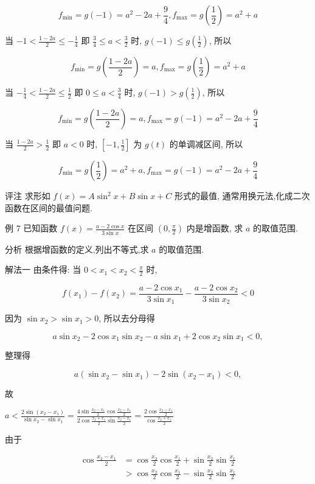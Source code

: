 $$
	f_{\min }=g(-1)=a^{2}-2 a+\frac{9}{4}, f_{\max }=g\left(\frac{1}{2}\right)=a^{2}+a
$$

当 $-1<\frac{1-2 a}{2} \leqslant-\frac{1}{4}$ 即 $\frac{3}{4} \leqslant a<\frac{3}{2}$ 时, $g(-1) \leqslant g\left(\frac{1}{2}\right)$, 所以

$$
	f_{\min }=g\left(\frac{1-2 a}{2}\right)=a, f_{\max }=g\left(\frac{1}{2}\right)=a^{2}+a
$$

当 $-\frac{1}{4}<\frac{1-2 a}{2} \leqslant \frac{1}{2}$ 即 $0 \leqslant a<\frac{3}{4}$ 时, $g(-1)>g\left(\frac{1}{2}\right)$, 所以

$$
	f_{\min }=g\left(\frac{1-2 a}{2}\right)=a, f_{\max }=g(-1)=a^{2}-2 a+\frac{9}{4}
$$

当 $\frac{1-2 a}{2}>\frac{1}{2}$ 即 $a<0$ 时, $\left[-1, \frac{1}{2}\right]$ 为 $g(t)$ 的单调减区间, 所以

$$
	f_{\min }=g\left(\frac{1}{2}\right)=a^{2}+a, f_{\max }=g(-1)=a^{2}-2 a+\frac{9}{4}
$$

评注 求形如 $f(x)=A \sin ^{2} x+B \sin x+C$ 形式的最值, 通常用换元法,化成二次函数在区间的最值问题.

例 7 已知函数 $f(x)=\frac{a-2 \cos x}{3 \sin x}$ 在区间 $\left(0, \frac{\pi}{2}\right)$ 内是增函数, 求 $a$ 的取值范围.

分析 根据增函数的定义,列出不等式,求 $a$ 的取值范围.

解法一 由条件得: 当 $0<x_{1}<x_{2}<\frac{\pi}{2}$ 时,

$$
	f\left(x_{1}\right)-f\left(x_{2}\right)=\frac{a-2 \cos x_{1}}{3 \sin x_{1}}-\frac{a-2 \cos x_{2}}{3 \sin x_{2}}<0
$$

因为 $\sin x_{2}>\sin x_{1}>0$, 所以去分母得

$$
	a \sin x_{2}-2 \cos x_{1} \sin x_{2}-a \sin x_{1}+2 \cos x_{2} \sin x_{1}<0,
$$

整理得

$$
	a\left(\sin x_{2}-\sin x_{1}\right)-2 \sin \left(x_{2}-x_{1}\right)<0,
$$

故

$a<\frac{2 \sin \left(x_{2}-x_{1}\right)}{\sin x_{2}-\sin x_{1}}=\frac{4 \sin \frac{x_{2}-x_{1}}{2} \cos \frac{x_{2}-x_{1}}{2}}{2 \cos \frac{x_{2}+x_{1}}{2} \sin \frac{x_{2}-x_{1}}{2}}=\frac{2 \cos \frac{x_{2}-x_{1}}{2}}{\cos \frac{x_{2}+x_{1}}{2}}$

由于

$$
	\begin{aligned}
		\cos \frac{x_{2}-x_{1}}{2} & =\cos \frac{x_{2}}{2} \cos \frac{x_{1}}{2}+\sin \frac{x_{2}}{2} \sin \frac{x_{1}}{2} \\
		                           & >\cos \frac{x_{2}}{2} \cos \frac{x_{1}}{2}-\sin \frac{x_{2}}{2} \sin \frac{x_{1}}{2}
	\end{aligned}
$$

